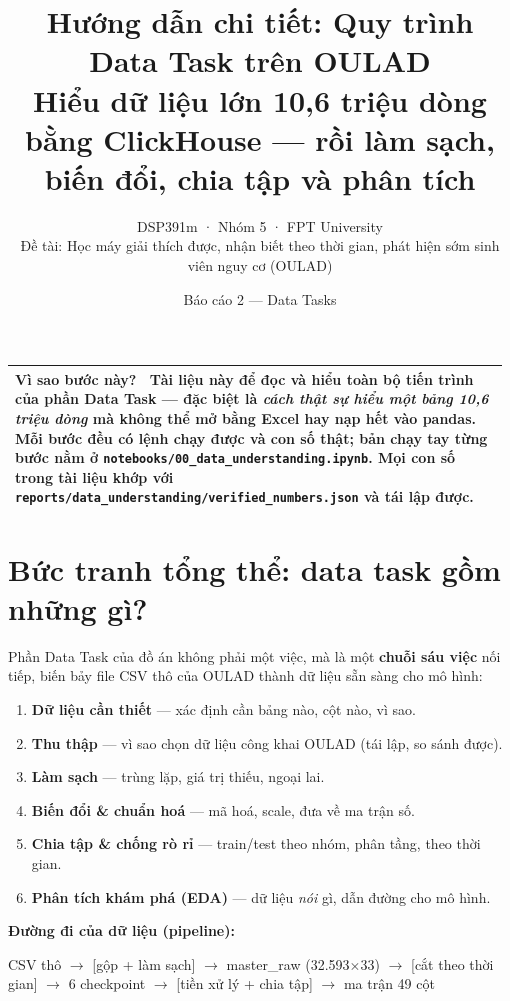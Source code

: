 \documentclass[11pt,a4paper]{article}
\title{\vspace{-1.2cm}\textbf{\color{themecol}Hướng dẫn chi tiết: Quy trình Data Task trên OULAD}\\[4pt]
\large Hiểu dữ liệu lớn \textbf{10,6 triệu dòng} bằng \textbf{ClickHouse} — rồi làm sạch, biến đổi, chia tập và phân tích}
\author{DSP391m · Nhóm 5 · FPT University \\ \small Đề tài: Học máy giải thích được, nhận biết theo thời gian, phát hiện sớm sinh viên nguy cơ (OULAD)}
\date{Báo cáo 2 — Data Tasks}
\makeatletter
\newenvironment{whybox}{%
  \par\smallskip\noindent\begin{tabular}{@{}p{0.985\linewidth}@{}}
  \arrayrulecolor{themecol}\hline\rule{0pt}{1.1em}\textbf{\color{themecol}Vì sao bước này?}\ \ignorespaces}{%
  \\\hline\end{tabular}\par\smallskip}
\makeatother
\begin{document}
\maketitle
\thispagestyle{fancy}

\begin{whybox}
Tài liệu này để \textbf{đọc và hiểu toàn bộ tiến trình} của phần Data Task — đặc biệt là
\textit{cách thật sự hiểu một bảng 10,6 triệu dòng} mà không thể mở bằng Excel hay nạp hết vào
pandas. Mỗi bước đều có \textbf{lệnh chạy được} và \textbf{con số thật}; bản chạy tay từng bước
nằm ở \texttt{notebooks/00\_data\_understanding.ipynb}. Mọi con số trong tài liệu khớp với
\texttt{reports/data\_understanding/verified\_numbers.json} và tái lập được.
\end{whybox}

\tableofcontents
\vspace{0.5em}

\section{Bức tranh tổng thể: data task gồm những gì?}
Phần Data Task của đồ án không phải một việc, mà là một \textbf{chuỗi sáu việc} nối tiếp, biến
bảy file CSV thô của OULAD thành dữ liệu sẵn sàng cho mô hình:

\begin{enumerate}[leftmargin=1.4em,itemsep=2pt]
  \item \textbf{Dữ liệu cần thiết} — xác định cần bảng nào, cột nào, vì sao.
  \item \textbf{Thu thập} — vì sao chọn dữ liệu công khai OULAD (tái lập, so sánh được).
  \item \textbf{Làm sạch} — trùng lặp, giá trị thiếu, ngoại lai.
  \item \textbf{Biến đổi \& chuẩn hoá} — mã hoá, scale, đưa về ma trận số.
  \item \textbf{Chia tập \& chống rò rỉ} — train/test theo nhóm, phân tầng, theo thời gian.
  \item \textbf{Phân tích khám phá (EDA)} — dữ liệu \textit{nói} gì, dẫn đường cho mô hình.
\end{enumerate}

\noindent\textbf{Đường đi của dữ liệu (pipeline):}
\begin{center}\small{} CSV thô $\rightarrow$ [gộp + làm sạch] $\rightarrow$ master\_raw (32.593$\times$33)
$\rightarrow$ [cắt theo thời gian] $\rightarrow$ 6 checkpoint
$\rightarrow$ [tiền xử lý + chia tập] $\rightarrow$ ma trận 49 cột
\end{center}
\end{document}
